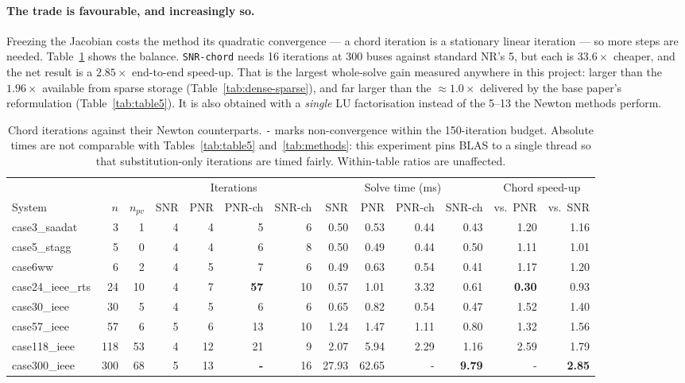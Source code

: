 \documentclass[sigconf,nonacm]{acmart}
\begin{document}
\paragraph{The trade is favourable, and increasingly so.}
Freezing the Jacobian costs the method its quadratic convergence --- a chord
iteration is a stationary linear iteration --- so more steps are needed.
Table~\ref{tab:chord} shows the balance. \texttt{SNR-chord} needs 16 iterations
at 300 buses against standard NR's 5, but each is $33.6\times$ cheaper, and the
net result is a \textbf{$2.85\times$} end-to-end speed-up. That is the largest
whole-solve gain measured anywhere in this project: larger than the $1.96\times$
available from sparse storage (Table~\ref{tab:dense-sparse}), and far larger
than the $\approx\!1.0\times$ delivered by the base paper's reformulation
(Table~\ref{tab:table5}). It is also obtained with a \emph{single} LU
factorisation instead of the 5--13 the Newton methods perform.

\begin{table}[t]
\centering
\caption{Chord iterations against their Newton counterparts. \texttt{-} marks
non-convergence within the 150-iteration budget. Absolute times are not
comparable with Tables~\ref{tab:table5} and~\ref{tab:methods}: this experiment
pins BLAS to a single thread so that substitution-only iterations are timed
fairly. Within-table ratios are unaffected.}
\label{tab:chord}
\footnotesize
\setlength{\tabcolsep}{4pt}
\begin{tabular}{l r r r r r r r r r r r r}
\toprule
& & & \multicolumn{4}{c}{Iterations} & \multicolumn{4}{c}{Solve time (ms)} & \multicolumn{2}{c}{Chord speed-up} \\
\cmidrule(lr){4-7}\cmidrule(lr){8-11}\cmidrule(lr){12-13}
System & $n$ & $n_{pv}$ & SNR & PNR & PNR-ch & SNR-ch & SNR & PNR & PNR-ch & SNR-ch
& vs.\ PNR & vs.\ SNR \\
\midrule
case3\_saadat     & 3   & 1  & 4 & 4  & 5  & 6  & 0.50  & 0.53  & 0.44 & 0.43 & 1.20 & 1.16 \\
case5\_stagg      & 5   & 0  & 4 & 4  & 6  & 8  & 0.50  & 0.49  & 0.44 & 0.50 & 1.11 & 1.01 \\
case6ww           & 6   & 2  & 4 & 5  & 7  & 6  & 0.49  & 0.63  & 0.54 & 0.41 & 1.17 & 1.20 \\
case24\_ieee\_rts & 24  & 10 & 4 & 7  & \textbf{57} & 10 & 0.57 & 1.01 & 3.32 & 0.61 & \textbf{0.30} & 0.93 \\
case30\_ieee      & 30  & 5  & 4 & 5  & 6  & 6  & 0.65  & 0.82  & 0.54 & 0.47 & 1.52 & 1.40 \\
case57\_ieee      & 57  & 6  & 5 & 6  & 13 & 10 & 1.24  & 1.47  & 1.11 & 0.80 & 1.32 & 1.56 \\
case118\_ieee     & 118 & 53 & 4 & 12 & 21 & 9  & 2.07  & 5.94  & 2.29 & 1.16 & 2.59 & 1.79 \\
case300\_ieee     & 300 & 68 & 5 & 13 & \textbf{-} & 16 & 27.93 & 62.65 & - & \textbf{9.79} & - & \textbf{2.85} \\
\bottomrule
\end{tabular}
\end{table}
\end{document}
